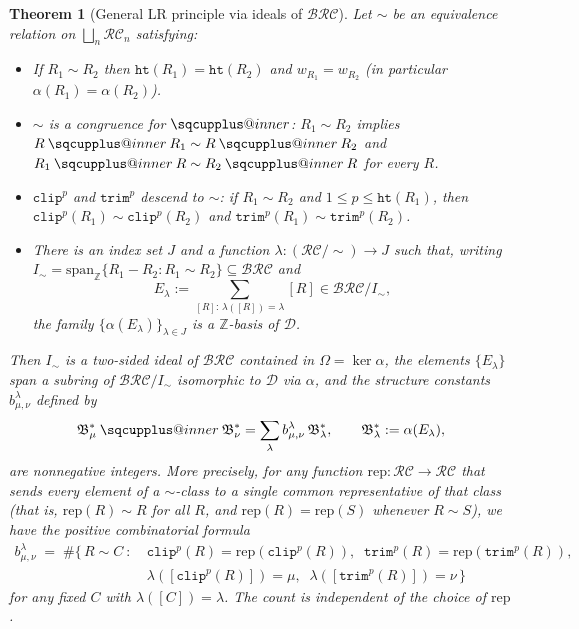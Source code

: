 \documentclass{amsart}
\makeatletter
\newcommand{\sqcupplus@inner}[2]{%
  \vcenter{\hbox{\ooalign{%
    \hfil$\m@th#1\sqcup$\hfil\cr
    \hfil\raisebox{0.15ex}{$\m@th#1\scriptscriptstyle+$}\hfil\cr
  }}}%
}
\newcommand{\sqcupplus}{\mathbin{\mathpalette\sqcupplus@inner\relax}}
\newtheorem{theorem}{Theorem}[section]
\theoremstyle{definition}
\theoremstyle{remark}
\numberwithin{equation}{subsection}
\newcommand{\wof}[1]{w_{#1}}
\newcommand{\trm}{\mathtt{trim}}
\newcommand{\hr}{\mathtt{ht}}
\newcommand{\clp}{\mathtt{clip}}
\newcommand{\BRC}{\mathcal{BRC}}
\newcommand{\RC}{\mathcal{RC}}
\newcommand{\dcoma}{\mathcal{D}}
\makeatother
\begin{document}
\begin{theorem}[General LR principle via ideals of $\BRC$]\label{theorem:general_lr_template}
Let $\sim$ be an equivalence relation on $\bigsqcup_n \RC_n$ satisfying:
\begin{itemize}
\item[(H1)] If $R_1\sim R_2$ then $\hr(R_1)=\hr(R_2)$ and $\wof{R_1}=\wof{R_2}$ (in particular $\alpha(R_1)=\alpha(R_2)$).
\item[(H2)] $\sim$ is a congruence for $\sqcupplus$: $R_1\sim R_2$ implies $R\sqcupplus R_1\sim R\sqcupplus R_2$ and $R_1\sqcupplus R\sim R_2\sqcupplus R$ for every $R$.
\item[(H3)] $\clp^p$ and $\trm^p$ descend to $\sim$: if $R_1\sim R_2$ and $1\leq p\leq \hr(R_1)$, then $\clp^p(R_1)\sim \clp^p(R_2)$ and $\trm^p(R_1)\sim \trm^p(R_2)$.
\item[(H4)] There is an index set $J$ and a function $\lambda:(\RC/\!\sim)\to J$ such that, writing $I_\sim=\mathrm{span}_{\mathbb{Z}}\{R_1-R_2:R_1\sim R_2\}\subseteq\BRC$ and
$$E_\lambda := \sum_{[R]:\,\lambda([R])=\lambda} [R] \in \BRC/I_\sim,$$
the family $\{\alpha(E_\lambda)\}_{\lambda\in J}$ is a $\mathbb{Z}$-basis of $\dcoma$.

\end{itemize}
Then $I_\sim$ is a two-sided ideal of $\BRC$ contained in $\Omega=\ker\alpha$, the elements $\{E_\lambda\}$ span a subring of $\BRC/I_\sim$ isomorphic to $\dcoma$ via $\alpha$, and the structure constants $b_{\mu,\nu}^\lambda$ defined by
$$\mathfrak{B}_\mu^*\sqcupplus\mathfrak{B}_\nu^* = \sum_\lambda b_{\mu,\nu}^\lambda\,\mathfrak{B}_\lambda^*,\qquad \mathfrak{B}_\lambda^*:=\alpha(E_\lambda),$$
are nonnegative integers. More precisely, for any function $\mathrm{rep}\colon\RC\to\RC$ that sends every element of a $\sim$-class to a single common representative of that class (that is, $\mathrm{rep}(R)\sim R$ for all $R$, and $\mathrm{rep}(R)=\mathrm{rep}(S)$ whenever $R\sim S$), we have the positive combinatorial formula
\begin{align*}
b_{\mu,\nu}^\lambda \;=\; \#\bigl\{\,R\sim C\ :\ &\clp^p(R)=\mathrm{rep}(\clp^p(R)),\;\;\trm^p(R)=\mathrm{rep}(\trm^p(R)),\\
&\lambda([\clp^p(R)])=\mu,\;\;\lambda([\trm^p(R)])=\nu\,\bigr\}
\end{align*}
for any fixed $C$ with $\lambda([C])=\lambda$. The count is independent of the choice of $\mathrm{rep}$.
\end{theorem}
\end{document}
